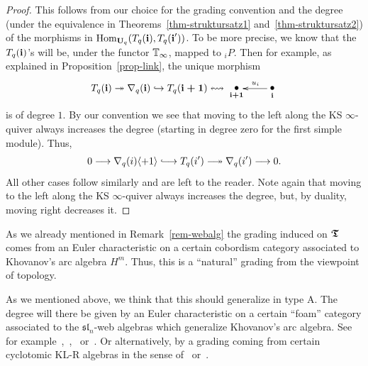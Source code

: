 \begin{proof}
This follows from our choice for the grading convention 
and the degree (under the equivalence in 
Theorems~\ref{thm-struktursatz1} and~\ref{thm-struktursatz2}) 
of the morphisms in $\mathrm{Hom}_{\boldsymbol{\mathrm{U}}_q}(T_q({\boldsymbol{\mathrm{i}}}),T_q({\boldsymbol{\mathrm{i}}^{\prime}}))$. 
To be more precise, we know that the $T_q({\boldsymbol{\mathrm{i}}})$'s will 
be, under the functor $\mathbb{T}_{\infty}$, 
mapped to ${}_iP$. Then for example, 
as explained in Proposition~\ref{prop-link}, the unique morphism
\[
\Tn{\bbi}\twoheadrightarrow\dVn{\bbi}\hookrightarrow\Tn{\bbiu}\leftrightsquigarrow\xymatrix{
  \raisebox{0.1cm}{\xy(0,0)*{\bullet};(0,-2.5)*{\scriptstyle \bbiu};\endxy}\!\!   &  \raisebox{0.1cm}{\xy(0,0)*{\bullet};(0,-2.5)*{\scriptstyle \bbi};\endxy} \ar[l]_/-0.2em/{u_i}\\
}
\]
is of degree $1$. By our convention 
we see that moving to the left along 
the KS $\infty$-quiver always increases 
the degree (starting in degree zero for the first simple module). Thus,
\[
0\longrightarrow \dVn{i}\langle+1\rangle\hooklongrightarrow\Tn{i^{\prime}}\twoheadlongrightarrow \dVn{i^{\prime}}\longrightarrow 0.
\]
All other cases follow similarly 
and are left to the reader. Note again 
that moving to the left along the KS 
$\infty$-quiver always increases the degree, 
but, by duality, moving right decreases it.
\end{proof}



\begin{rem}\label{rem-webalg2}
As we already mentioned in 
Remark~\ref{rem-webalg} the grading induced on 
$\boldsymbol{\mathfrak{T}}$ comes from an Euler characteristic on a 
certain cobordism category associated to 
Khovanov's arc algebra $H^m$. Thus, this is 
a ``natural'' grading from the viewpoint of topology.



As we mentioned above, we think that this 
should generalize in type $\boldsymbol{\mathrm{A}}$. The degree will 
there be given by an Euler characteristic on 
a certain ``foam'' category associated to the 
$\mathfrak{sl}_n$-web algebras which generalize Khovanov's arc algebra. See for example~\cite{lqr1},~\cite{mpt},~\cite{qr1} or~\cite{tub4}. 
Or alternatively, by a grading coming from certain cyclotomic KL-R algebras in the sense of~\cite{kl5} or~\cite{rou}.
\end{rem}




